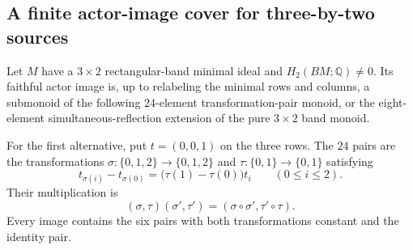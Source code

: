 \subsection{A finite actor-image cover for three-by-two sources}

\begin{lemma}
\label{CP2:A-three-by-two-balanced-actor-cover}
Let $M$ have a $3\times2$ rectangular-band minimal ideal and
$H_2(BM;\mathbb Q)\ne0$.  Its faithful actor image is, up to
relabeling the minimal rows and columns, a submonoid of the
following $24$-element transformation-pair monoid, or the
eight-element simultaneous-reflection extension of the pure
$3\times2$ band monoid.

For the first alternative, put $t=(0,0,1)$ on the three rows.
The $24$ pairs are the transformations
$\sigma:\{0,1,2\}\to\{0,1,2\}$ and
$\tau:\{0,1\}\to\{0,1\}$ satisfying
\[
 t_{\sigma(i)}-t_{\sigma(0)}
     =\bigl(\tau(1)-\tau(0)\bigr)t_i
       \qquad(0\leq i\leq2).                                  \tag{1}
\]
Their multiplication is
\[
       (\sigma,\tau)(\sigma',\tau')
          =(\sigma\circ\sigma',\tau'\circ\tau).
                                                               \tag{2}
\]
Every image contains the six pairs with both transformations
constant and the identity pair.
\end{lemma}
